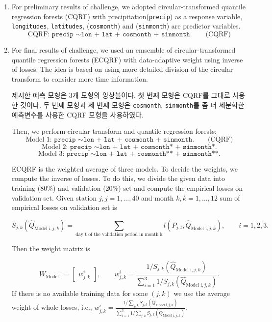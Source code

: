 \documentclass[11pt,titlepage]{article}
\begin{document}
	\begin{enumerate}
		\item For preliminary results of challenge, we adopted circular-transformed quantile regression forests (CQRF) with precipitation(\texttt{precip}) as a response variable, \texttt{longitudes}, \texttt{latitudes}, (\texttt{cosmonth}) and (\texttt{sinmonth}) are predictor variables. %
		$$\text{CQRF: } \texttt{precip }\sim \texttt{lon + lat + cosmonth + sinmonth.}\qquad{\text{(CQRF)}}$$
		
		\item For final results of challenge, we used an emsemble of circular-transformed quantile regression forests (ECQRF) with data-adaptive weight using inverse of losses. The idea is based on using more detailed division of the circular transform to consider more time information. 
		
		제시한 예측 모형은 3개 모형의 앙상블이다. 첫 번째 모형은 CQRF를 그대로 사용한 것이다. 두 번째 모형과 세 번째 모형은 \texttt{cosmonth}, \texttt{sinmonth}를 좀 더 세분화한 예측변수를 사용한 CQRF 모형을 사용하였다.
				
		Then, we perform circular transform and quantile regression forests:
		$$\text{Model 1: }\texttt{precip }\sim \texttt{lon + lat + cosmonth + sinmonth.}\qquad{\text{(CQRF)}}$$
		$$\text{Model 2: }\texttt{precip }\sim \texttt{lon + lat + cosmonth* + sinmonth*.}$$
		$$\text{Model 3: }\texttt{precip }\sim \texttt{lon + lat + cosmonth** + sinmonth**.}$$
		
		ECQRF is the weighted average of three models. To decide the weights, we compute the inverse of losses. To do this, we divide the given data into training (80$\%$) and validation (20$\%$) set and compute the empirical losses on validation set.  Given station $j, j=1,\ldots, 40$ and month $k, k=1,\ldots, 12$  sum of empirical losses on validation set is
		
		$$S_{j,k}(\hat{Q}_{\text{Model i},j,k} )= \sum_{\text{day t of the validation period in month k}} l(P_{j,t},\hat{Q}_{\text{Model i},j,k}), \qquad{i=1,2,3.}$$
		
		Then the weight matrix is
		
		$$W_{\text{Model i}}=
		\begin{bmatrix}
		w_{j,k}^{i}
		\end{bmatrix}
		, \qquad{w_{j,k}^{i} = \frac{1/S_{j,k}(\hat{Q}_{\text{Model i},j,k})}{\sum_{i=1}^{3}1/S_{j,k}(\hat{Q}_{\text{Model i},j,k})} .}$$
		If there is no available training data for some $(j,k)$ we use the average weight of whole losses, i.e., $w_{j,k}^{i} = \frac{1/\sum_{j,k}S_{j,k}(\hat{Q}_{\text{Model i},j,k})}{\sum_{i=1}^{3}1/\sum_{j,k}S_{j,k}(\hat{Q}_{\text{Model i},j,k})} .$
		

\end{enumerate}
\end{document}
